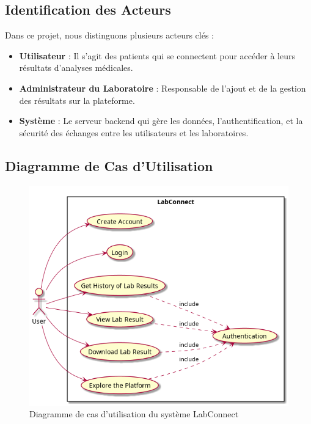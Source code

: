 \documentclass[12pt,a4paper]{report}
\begin{document}
\subsection{Identification des Acteurs}
Dans ce projet, nous distinguons plusieurs acteurs clés :

\begin{itemize}
    \item \textbf{Utilisateur} : Il s'agit des patients qui se connectent pour accéder à leurs résultats d'analyses médicales.
    
    \item \textbf{Administrateur du Laboratoire} : Responsable de l'ajout et de la gestion des résultats sur la plateforme.
    
    \item \textbf{Système} : Le serveur backend qui gère les données, l'authentification, et la sécurité des échanges entre les utilisateurs et les laboratoires.
\end{itemize}

\subsection{Diagramme de Cas d'Utilisation}
\begin{figure}[h]
\includegraphics[width=\textwidth]{./img/diagram/UseCases/global.png}
\caption{Diagramme de cas d'utilisation du système LabConnect}
\label{fig:use-case}
\end{figure}
\end{document}
